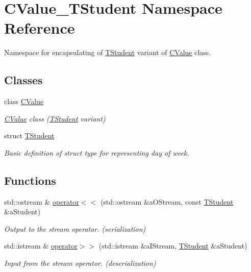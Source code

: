 \hypertarget{namespace_c_value___t_student}{}\section{C\+Value\+\_\+\+T\+Student Namespace Reference}
\label{namespace_c_value___t_student}


Namespace for encapsulating of {\ttfamily \hyperlink{struct_c_value___t_student_1_1_t_student}{T\+Student}} variant of \hyperlink{class_c_value___t_student_1_1_c_value}{C\+Value} class.  


\subsection*{Classes}
\begin{DoxyCompactItemize}
\item 
class \hyperlink{class_c_value___t_student_1_1_c_value}{C\+Value}
\begin{DoxyCompactList}\small\item\em \hyperlink{class_c_value___t_student_1_1_c_value}{C\+Value} class ({\ttfamily \hyperlink{struct_c_value___t_student_1_1_t_student}{T\+Student}} variant) \end{DoxyCompactList}\item 
struct \hyperlink{struct_c_value___t_student_1_1_t_student}{T\+Student}
\begin{DoxyCompactList}\small\item\em Basic definition of struct type for representing day of week. \end{DoxyCompactList}\end{DoxyCompactItemize}
\subsection*{Functions}
\begin{DoxyCompactItemize}
\item 
std\+::ostream \& \hyperlink{namespace_c_value___t_student_a74d67e5f2ecbfee96605b87464c628ca}{operator$<$$<$} (std\+::ostream \&a\+O\+Stream, const \hyperlink{struct_c_value___t_student_1_1_t_student}{T\+Student} \&a\+Student)
\begin{DoxyCompactList}\small\item\em Output to the stream operator. ({\itshape serialization}) \end{DoxyCompactList}\item 
std\+::istream \& \hyperlink{namespace_c_value___t_student_a7cef4a5db96e988bb59a53168f90363f}{operator$>$$>$} (std\+::istream \&a\+I\+Stream, \hyperlink{struct_c_value___t_student_1_1_t_student}{T\+Student} \&a\+Student)
\begin{DoxyCompactList}\small\item\em Input from the stream operator. ({\itshape deserialization}) \end{DoxyCompactList}\end{DoxyCompactItemize}


